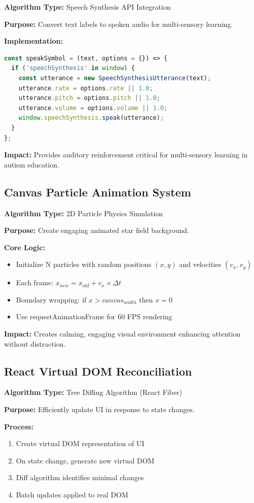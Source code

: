 \documentclass[11pt, a4paper]{article}
\begin{document}
\textbf{Algorithm Type:} Speech Synthesis API Integration

\textbf{Purpose:} Convert text labels to spoken audio for multi-sensory learning.

\textbf{Implementation:}
\begin{lstlisting}[language=JavaScript]
const speakSymbol = (text, options = {}) => {
  if ('speechSynthesis' in window) {
    const utterance = new SpeechSynthesisUtterance(text);
    utterance.rate = options.rate || 1.0;
    utterance.pitch = options.pitch || 1.0;
    utterance.volume = options.volume || 1.0;
    window.speechSynthesis.speak(utterance);
  }
};
\end{lstlisting}

\textbf{Impact:} Provides auditory reinforcement critical for multi-sensory learning in autism education.

\subsection{Canvas Particle Animation System}

\textbf{Algorithm Type:} 2D Particle Physics Simulation

\textbf{Purpose:} Create engaging animated star field background.

\textbf{Core Logic:}
\begin{itemize}[leftmargin=*, noitemsep]
    \item Initialize N particles with random positions $(x, y)$ and velocities $(v_x, v_y)$
    \item Each frame: $x_{new} = x_{old} + v_x \times \Delta t$
    \item Boundary wrapping: if $x > canvas_{width}$ then $x = 0$
    \item Use requestAnimationFrame for 60 FPS rendering
\end{itemize}

\textbf{Impact:} Creates calming, engaging visual environment enhancing attention without distraction.

\subsection{React Virtual DOM Reconciliation}

\textbf{Algorithm Type:} Tree Diffing Algorithm (React Fiber)

\textbf{Purpose:} Efficiently update UI in response to state changes.

\textbf{Process:}
\begin{enumerate}[leftmargin=*, noitemsep]
    \item Create virtual DOM representation of UI
    \item On state change, generate new virtual DOM
    \item Diff algorithm identifies minimal changes
    \item Batch updates applied to real DOM
\end{enumerate}
\end{document}
